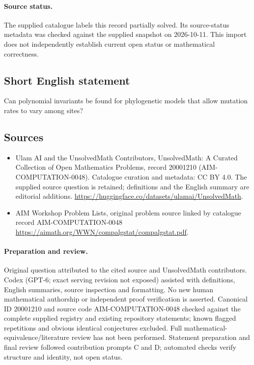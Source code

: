 \documentclass[11pt]{article}
\begin{document}
\paragraph{Source status.}
The supplied catalogue labels this record partially solved. Its source-status metadata was checked against the supplied snapshot on 2026-10-11. This import does not independently establish current open status or mathematical correctness.
\subsection{Short English statement}
Can polynomial invariants be found for phylogenetic models that allow mutation rates to vary among sites?
\subsection{Sources}
\begin{itemize}
\item[\hypertarget{source:20001210:1}{S1}] Ulam AI and the UnsolvedMath Contributors, UnsolvedMath: A Curated Collection of Open Mathematics Problems, record 20001210 (AIM-COMPUTATION-0048). Catalogue curation and metadata: CC BY 4.0. The supplied source question is retained; definitions and the English summary are editorial additions.
\url{https://huggingface.co/datasets/ulamai/UnsolvedMath}.
\item[\hypertarget{source:20001210:2}{S2}] AIM Workshop Problem Lists, original problem source linked by catalogue record AIM-COMPUTATION-0048
\url{https://aimath.org/WWN/compalgstat/compalgstat.pdf}.
\end{itemize}
\paragraph{Preparation and review.}
Original question attributed to the cited source and UnsolvedMath contributors. Codex (GPT-6; exact serving revision not exposed) assisted with definitions, English summaries, source inspection and formatting. No new human mathematical authorship or independent proof verification is asserted. Canonical ID 20001210 and source code AIM-COMPUTATION-0048 checked against the complete supplied registry and existing repository statements; known flagged repetitions and obvious identical conjectures excluded. Full mathematical-equivalence/literature review has not been performed. Statement preparation and final review followed contribution prompts C and D; automated checks verify structure and identity, not open status.
\label{end:20001210}
\end{document}
